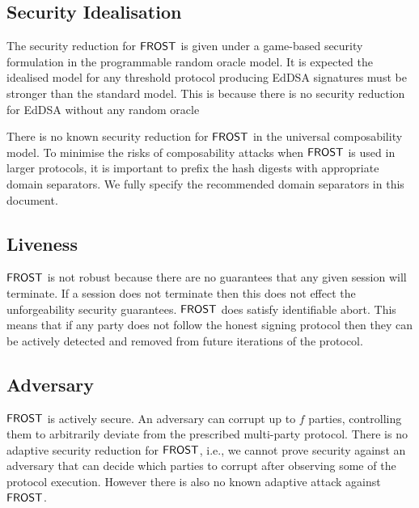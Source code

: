 \subsection{Security Idealisation}\label{section:comparisons:idealisation}
The security reduction for $\mathsf{FROST}$ is given under a game-based security formulation in the programmable random oracle model.
It is expected the idealised model for any threshold protocol producing EdDSA signatures must be stronger than the standard model.
This is because there is no security reduction for EdDSA without any random oracle~\cite{PaillierV05,FischlinF13,FleischhackerJS14}

There is no known security reduction for $\mathsf{FROST}$ in the universal composability model.
To minimise the risks of composability attacks when $\mathsf{FROST}$ is used in larger protocols,
it is important to prefix the hash digests with appropriate domain separators.
We fully specify the recommended domain separators in this document.

\subsection{Liveness}
$\mathsf{FROST}$ is not  robust because there are no guarantees that any given session will terminate.
If a session does not terminate then this does not effect the unforgeability security guarantees.
$\mathsf{FROST}$ does satisfy identifiable abort.  This means that if any party does not follow the honest signing protocol then they can be actively detected and removed from future iterations of the protocol.


\subsection{Adversary}\label{section:comparisons:adversary}
$\mathsf{FROST}$ is actively secure.  An adversary can corrupt up to $f$ parties, controlling them to arbitrarily deviate from the prescribed multi-party protocol.
There is no adaptive security reduction for $\mathsf{FROST}$, i.e., we cannot prove security against an adversary that can decide which parties to corrupt after observing some of the protocol execution.
However there is also no known adaptive attack against $\mathsf{FROST}$.



